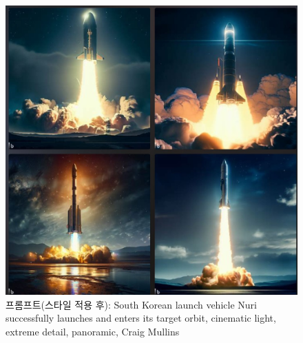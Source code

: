\documentclass[
  letterpaper,
]{book}
\begin{document}
\begin{figure}
\begin{minipage}[t]{0.49\linewidth}
{{\includegraphics{images/nuri_image_02.jpg}

}

\caption{프롬프트(스타일 적용 후): South Korean launch vehicle Nuri
successfully launches and enters its target orbit, cinematic light,
extreme detail, panoramic, Craig Mullins}

}

\end{minipage}%
\newline
\begin{minipage}[t]{\linewidth}

{\centering 

}
\end{minipage}
\end{figure}
\end{document}
